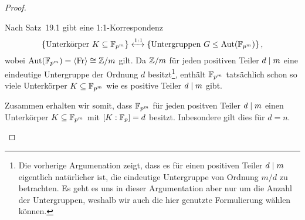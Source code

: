 \begin{proof}
\begin{itemize}[resume]
      Nach Satz~19.1 gibt eine 1:1-Korrespondenz
      \[
                              \{ \text{Unterkörper $K \subseteq \mathbb{F}_{p^m}$}  \}
        \xleftrightarrow{1:1} \{ \text{Untergruppen $G \leq \operatorname{Aut}(\mathbb{F}_{p^m})$} \}  \,,
      \]
      wobei $\operatorname{Aut}(\mathbb{F}_{p^m}) = \langle\operatorname{Fr}\rangle \cong \mathbb{Z}/m$ gilt.
      Da $\mathbb{Z}/m$ für jeden positiven Teiler $d \mathrel{|} m$ eine eindeutige Untergruppe der Ordnung $d$ besitzt\footnote{
      Die vorherige Argumenation zeigt, dass es für einen positiven Teiler $d \mathrel{|} m$ eigentlich natürlicher ist, die eindeutige Untergruppe von Ordnung $m/d$ zu betrachten.
      Es geht es uns in dieser Argumentation aber nur um die Anzahl der Untergruppen, weshalb wir auch die hier genutzte Formulierung wählen können.},
      enthält $\mathbb{F}_{p^m}$ tatsächlich schon so viele Unterkörper $K \subseteq \mathbb{F}_{p^m}$ wie es positive Teiler $d \mathrel{|} m$ gibt.
      
      Zusammen erhalten wir somit, dass $\mathbb{F}_{p^m}$ für jeden positven Teiler $d \mathrel{|} m$ einen Unterkörper $K \subseteq \mathbb{F}_{p^m}$ mit $[K : \mathbb{F}_{p}] = d$ besitzt.
      Inbesondere gilt dies für $d = n$.
  \qedhere
  \end{itemize}

\end{proof}

